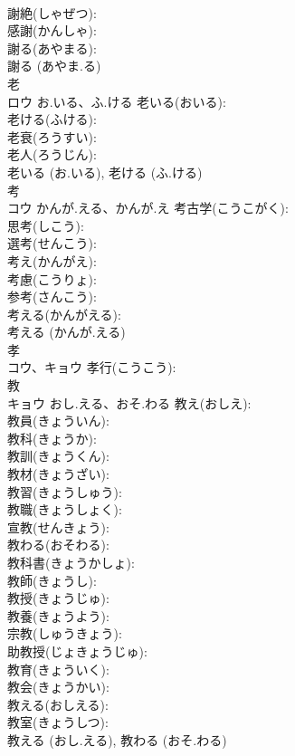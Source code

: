 \documentclass[8pt]{extreport}
\begin{document}
\begin{CJK}{UTF8}{min}
\\	謝絶(しゃぜつ): 
\\	感謝(かんしゃ): 
\\	謝る(あやまる): 
\\	謝る (あやま.る)
\\	老			
\\	ロウ	お.いる、ふ.ける	老いる(おいる): 
\\	老ける(ふける): 
\\	老衰(ろうすい): 
\\	老人(ろうじん): 
\\	老いる (お.いる), 老ける (ふ.ける)
\\	考			
\\	コウ	かんが.える、かんが.え	考古学(こうこがく): 
\\	思考(しこう): 
\\	選考(せんこう): 
\\	考え(かんがえ): 
\\	考慮(こうりょ): 
\\	参考(さんこう): 
\\	考える(かんがえる): 
\\	考える (かんが.える)
\\	孝			
\\	コウ、キョウ		孝行(こうこう): 
\\	教			
\\	キョウ	おし.える、おそ.わる	教え(おしえ): 
\\	教員(きょういん): 
\\	教科(きょうか): 
\\	教訓(きょうくん): 
\\	教材(きょうざい): 
\\	教習(きょうしゅう): 
\\	教職(きょうしょく): 
\\	宣教(せんきょう): 
\\	教わる(おそわる): 
\\	教科書(きょうかしょ): 
\\	教師(きょうし): 
\\	教授(きょうじゅ): 
\\	教養(きょうよう): 
\\	宗教(しゅうきょう): 
\\	助教授(じょきょうじゅ): 
\\	教育(きょういく): 
\\	教会(きょうかい): 
\\	教える(おしえる): 
\\	教室(きょうしつ): 
\\	教える (おし.える), 教わる (おそ.わる)

\end{CJK}
\end{document}
